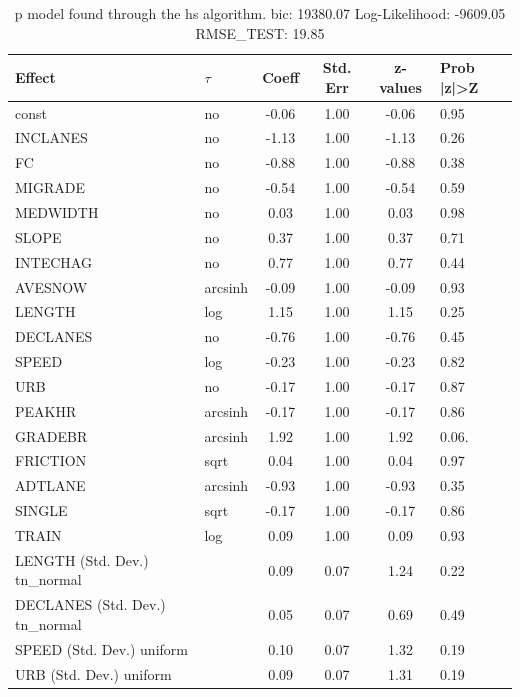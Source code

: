 \begin{table}
	\caption{p model found through the hs algorithm. bic: 19380.07 Log-Likelihood: -9609.05 RMSE_TEST: 19.85}
	\begin{center}
		\begin{tabular}{|l|l|c|c|c|l|}
			\hline
			Effect & $\tau$ & Coeff & Std. Err & z-values & Prob |z|>Z \\
			\hline
			const & no & -0.06 & 1.00 & -0.06 & 0.95 \\
			\hline
			INCLANES & no & -1.13 & 1.00 & -1.13 & 0.26 \\
			\hline
			FC & no & -0.88 & 1.00 & -0.88 & 0.38 \\
			\hline
			MIGRADE & no & -0.54 & 1.00 & -0.54 & 0.59 \\
			\hline
			MEDWIDTH & no & 0.03 & 1.00 & 0.03 & 0.98 \\
			\hline
			SLOPE & no & 0.37 & 1.00 & 0.37 & 0.71 \\
			\hline
			INTECHAG & no & 0.77 & 1.00 & 0.77 & 0.44 \\
			\hline
			AVESNOW & arcsinh & -0.09 & 1.00 & -0.09 & 0.93 \\
			\hline
			LENGTH & log & 1.15 & 1.00 & 1.15 & 0.25 \\
			\hline
			DECLANES & no & -0.76 & 1.00 & -0.76 & 0.45 \\
			\hline
			SPEED & log & -0.23 & 1.00 & -0.23 & 0.82 \\
			\hline
			URB & no & -0.17 & 1.00 & -0.17 & 0.87 \\
			\hline
			PEAKHR & arcsinh & -0.17 & 1.00 & -0.17 & 0.86 \\
			\hline
			GRADEBR & arcsinh & 1.92 & 1.00 & 1.92 & 0.06. \\
			\hline
			FRICTION & sqrt & 0.04 & 1.00 & 0.04 & 0.97 \\
			\hline
			ADTLANE & arcsinh & -0.93 & 1.00 & -0.93 & 0.35 \\
			\hline
			SINGLE & sqrt & -0.17 & 1.00 & -0.17 & 0.86 \\
			\hline
			TRAIN & log & 0.09 & 1.00 & 0.09 & 0.93 \\
			\hline
			LENGTH (Std. Dev.) tn_normal &  & 0.09 & 0.07 & 1.24 & 0.22 \\
			\hline
			DECLANES (Std. Dev.) tn_normal &  & 0.05 & 0.07 & 0.69 & 0.49 \\
			\hline
			SPEED (Std. Dev.) uniform &  & 0.10 & 0.07 & 1.32 & 0.19 \\
			\hline
			URB (Std. Dev.) uniform &  & 0.09 & 0.07 & 1.31 & 0.19 \\

\end{tabular}
\end{center}
\end{table}

